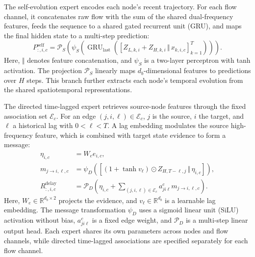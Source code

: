 The self-evolution expert encodes each node's recent trajectory. For each flow channel, it concatenates raw flow with the sum of the shared dual-frequency features, feeds the sequence to a shared gated recurrent unit (GRU), and maps the final hidden state to a multi-step prediction:
\begin{equation}
\label{eq:self-expert}
P^{\mathrm{self}}_{:,i,c}
=\mathcal{P}_{S}\!\left(\psi_S\!\left(\operatorname{GRU}_{\mathrm{last}}
\left([Z_{L,k,i}+Z_{H,k,i}\,\Vert\,x_{k,i,c}]_{k=1}^{T}\right)\right)\right).
\end{equation}
Here, \(\Vert\) denotes feature concatenation, and \(\psi_S\) is a two-layer perceptron with tanh activation. The projection \(\mathcal{P}_S\) linearly maps \(d_b\)-dimensional features to predictions over \(H\) steps. This branch further extracts each node's temporal evolution from the shared spatiotemporal representations.

The directed time-lagged expert retrieves source-node features through the fixed association set \(\mathcal{E}_c\). For an edge \((j,i,\ell)\in\mathcal{E}_c\), \(j\) is the source, \(i\) the target, and \(\ell\) a historical lag with \(0<\ell<T\). A lag embedding modulates the source high-frequency feature, which is combined with target state evidence to form a message:
\begin{equation}
\label{eq:delay-expert}
\begin{aligned}
\eta_{i,c}&=W_e e_{i,c},\\
m_{j\to i,\ell,c}&=\psi_D\!\left([(1+\tanh v_{\ell})\odot Z_{H,T-\ell,j}\,\Vert\,\eta_{i,c}]\right),\\
R^{\mathrm{delay}}_{:,i,c}&=\mathcal{P}_D\!\left(\eta_{i,c}
+\sum_{(j,i,\ell)\in\mathcal{E}_c}a_{ji\ell}^{c}m_{j\to i,\ell,c}\right).
\end{aligned}
\end{equation}
Here, \(W_e\in\mathbb{R}^{d_b\times2}\) projects the evidence, and \(v_\ell\in\mathbb{R}^{d_b}\) is a learnable lag embedding. The message transformation \(\psi_D\) uses a sigmoid linear unit (SiLU) activation without bias, \(a_{ji\ell}^{c}\) is a fixed edge weight, and \(\mathcal{P}_D\) is a multi-step linear output head. Each expert shares its own parameters across nodes and flow channels, while directed time-lagged associations are specified separately for each flow channel.


